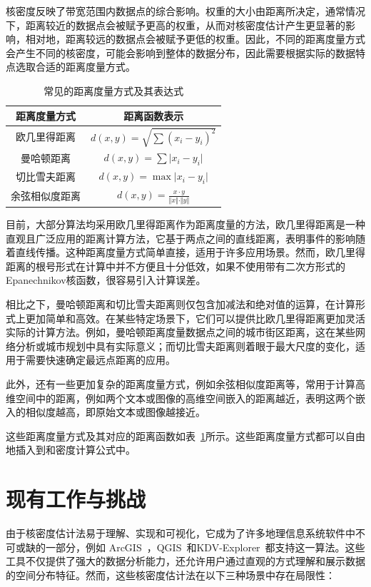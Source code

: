 核密度反映了带宽范围内数据点的综合影响。权重的大小由距离所决定，通常情况下，距离较近的数据点会被赋予更高的权重，从而对核密度估计产生更显著的影响，相对地，距离较远的数据点会被赋予更低的权重。因此，不同的距离度量方式会产生不同的核密度，可能会影响到整体的数据分布，因此需要根据实际的数据特点选取合适的距离度量方式。

\begin{table}[!h]
	\centering
	\def\arraystretch{1.5}
	\caption{常见的距离度量方式及其表达式}
	\label{tab2}
	\begin{tabular}{c|c}
		\hline
		距离度量方式       & 距离函数表示   \\ \hline \hline
		欧几里得距离 & $d(x, y) = \sqrt{\sum{(x_i - y_i)}^2}$ \\ 
		曼哈顿距离   & $d(x, y) = \sum \vert x_i - y_i \vert$ \\ 
		切比雪夫距离 & $d(x, y) = \max \vert x_i - y_i \vert$ \\ 
		余弦相似度距离	 & $d(x, y) = \frac{x \cdot y}{\Vert x \Vert \cdot \Vert y \Vert}$     \\ \hline
	\end{tabular}
\end{table}

目前，大部分算法均采用欧几里得距离作为距离度量的方法，欧几里得距离是一种直观且广泛应用的距离计算方法，它基于两点之间的直线距离，表明事件的影响随着直线传播。这种距离度量方式简单直接，适用于许多应用场景。然而，欧几里得距离的根号形式在计算中并不方便且十分低效，如果不使用带有二次方形式的Epanechnikov核函数，很容易引入计算误差。

相比之下，曼哈顿距离和切比雪夫距离则仅包含加减法和绝对值的运算，在计算形式上更加简单和高效。在某些特定场景下，它们可以提供比欧几里得距离更加灵活实际的计算方法。例如，曼哈顿距离度量数据点之间的城市街区距离，这在某些网络分析或城市规划中具有实际意义；而切比雪夫距离则着眼于最大尺度的变化，适用于需要快速确定最远点距离的应用。

此外，还有一些更加复杂的距离度量方式，例如余弦相似度距离等，常用于计算高维空间中的距离，例如两个文本或图像的高维空间嵌入的距离越近，表明这两个嵌入的相似度越高，即原始文本或图像越接近。

这些距离度量方式及其对应的距离函数如表~\ref{tab2}所示。这些距离度量方式都可以自由地插入到和密度计算公式中。

\section{现有工作与挑战}

由于核密度估计法易于理解、实现和可视化，它成为了许多地理信息系统软件中不可或缺的一部分，例如 ArcGIS~\cite{noauthor_arcgis_nodate}，QGIS~\cite{noauthor_qgis_nodate}和KDV-Explorer~\cite{chan_kdv-explorer_2021}都支持这一算法。这些工具不仅提供了强大的数据分析能力，还允许用户通过直观的方式理解和展示数据的空间分布特征。然而，这些核密度估计法在以下三种场景中存在局限性：

